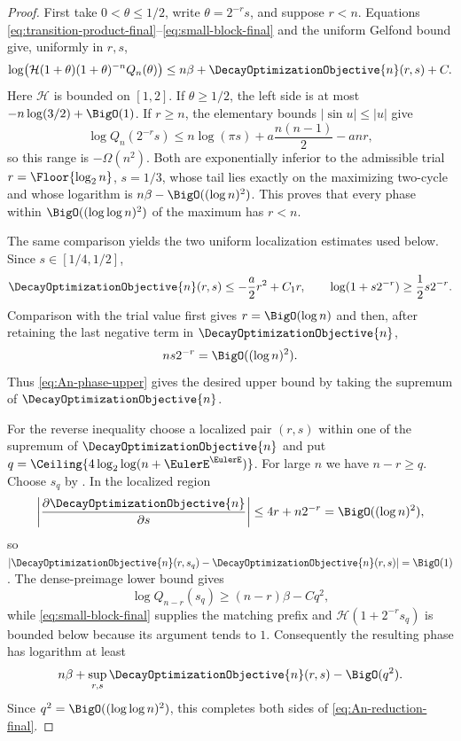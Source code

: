 \documentclass[11pt,oneside]{article}
\numberwithin{equation}{section}
\theoremstyle{definition}
\theoremstyle{remark}
\begin{document}
\begin{proof}
First take $0<\theta\le1/2$, write $\theta=2^{-r}s$, and suppose $r<n$.
Equations \eqref{eq:transition-product-final}--\eqref{eq:small-block-final} and the uniform
Gelfond bound give, uniformly in $r,s$,
\begin{equation}
 \log\!\left(\mathcal H(1+\theta)(1+\theta)^{-n}Q_n(\theta)\right)
 \le n\beta+\DecayOptimizationObjective{n}(r,s)+C.
 \label{eq:An-phase-upper}
\end{equation}
Here $\mathcal H$ is bounded on $[1,2]$.  If $\theta\ge1/2$, the left side is at most
$-n\log(3/2)+\BigO(1)$.  If $r\ge n$, the elementary bounds
$|\sin u|\le|u|$ give
\[
 \log Q_n(2^{-r}s)
 \le n\log(\pi s)+a\frac{n(n-1)}2-anr,
\]
so this range is $-\Omega(n^2)$.  Both are exponentially inferior to the admissible trial
$r=\Floor{\log_2n}$, $s=1/3$, whose tail lies exactly on the maximizing two-cycle and
whose logarithm is $n\beta-\BigO((\log n)^2)$.  This proves that every phase within
$\BigO((\log\log n)^2)$ of the maximum has $r<n$.

The same comparison yields the two uniform localization estimates used below.  Since
$s\in[1/4,1/2]$,
\[
 \DecayOptimizationObjective{n}(r,s)\le-\frac a2r^2+C_1r,
 \qquad
 \log(1+s2^{-r})\ge\frac12s2^{-r}.
\]
Comparison with the trial value first gives $r=\BigO(\log n)$ and then, after retaining the
last negative term in $\DecayOptimizationObjective{n}$,
\begin{equation}
 ns2^{-r}=\BigO((\log n)^2).
 \label{eq:boundary-localization}
\end{equation}
Thus \eqref{eq:An-phase-upper} gives the desired upper bound by taking the supremum of
$\DecayOptimizationObjective{n}$.

For the reverse inequality choose a localized pair $(r,s)$ within one of the supremum of
$\DecayOptimizationObjective{n}$ and put
$q=\Ceiling{4\log_2\log(n+\EulerE^\EulerE)}$.  For large $n$ we have $n-r\ge q$.
Choose $s_q$ by .  In the localized region
\[
 \left|\frac{\partial\DecayOptimizationObjective{n}}{\partial s}\right|
 \le4r+n2^{-r}=\BigO((\log n)^2),
\]
so $|\DecayOptimizationObjective{n}(r,s_q)-\DecayOptimizationObjective{n}(r,s)|=\BigO(1)$.  The dense-preimage lower bound gives
\[
 \log Q_{n-r}(s_q)\ge(n-r)\beta-Cq^2,
\]
while \eqref{eq:small-block-final} supplies the matching prefix and
$\mathcal H(1+2^{-r}s_q)$ is bounded below because its argument tends to $1$.
Consequently the resulting phase has logarithm at least
\[
 n\beta+\sup_{r,s}\DecayOptimizationObjective{n}(r,s)-\BigO(q^2).
\]
Since $q^2=\BigO((\log\log n)^2)$, this completes both sides of
\eqref{eq:An-reduction-final}.
\end{proof}
\end{document}
